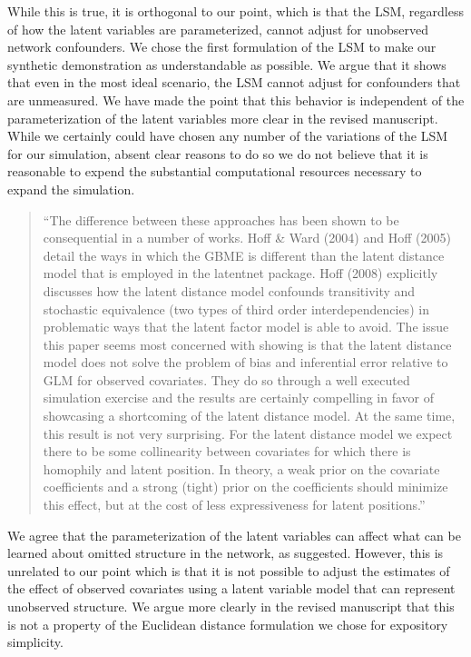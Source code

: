 While this is true, it is orthogonal to our point, which is that the
LSM, regardless of how the latent variables are parameterized, cannot
adjust for unobserved network confounders. We chose the first
formulation of the LSM to make our synthetic demonstration as
understandable as possible. We argue that it shows that even in the most
ideal scenario, the LSM cannot adjust for confounders that are
unmeasured. We have made the point that this behavior is independent of
the parameterization of the latent variables more clear in the revised
manuscript. While we certainly could have chosen any number of the
variations of the LSM for our simulation, absent clear reasons to do so
we do not believe that it is reasonable to expend the substantial
computational resources necessary to expand the simulation.

\begin{quote}
``The difference between these approaches has been shown to be
consequential in a number of works. Hoff \& Ward (2004) and Hoff (2005)
detail the ways in which the GBME is different than the latent distance
model that is employed in the latentnet package. Hoff (2008) explicitly
discusses how the latent distance model confounds transitivity and
stochastic equivalence (two types of third order interdependencies) in
problematic ways that the latent factor model is able to avoid. The
issue this paper seems most concerned with showing is that the latent
distance model does not solve the problem of bias and inferential error
relative to GLM for observed covariates. They do so through a well
executed simulation exercise and the results are certainly compelling in
favor of showcasing a shortcoming of the latent distance model. At the
same time, this result is not very surprising. For the latent distance
model we expect there to be some collinearity between covariates for
which there is homophily and latent position. In theory, a weak prior on
the covariate coefficients and a strong (tight) prior on the
coefficients should minimize this effect, but at the cost of less
expressiveness for latent positions.''
\end{quote}

We agree that the parameterization of the latent variables can affect
what can be learned about omitted structure in the network, as
suggested. However, this is unrelated to our point which is that it is
not possible to adjust the estimates of the effect of observed
covariates using a latent variable model that can represent unobserved
structure. We argue more clearly in the revised manuscript that this is
not a property of the Euclidean distance formulation we chose for
expository simplicity.
